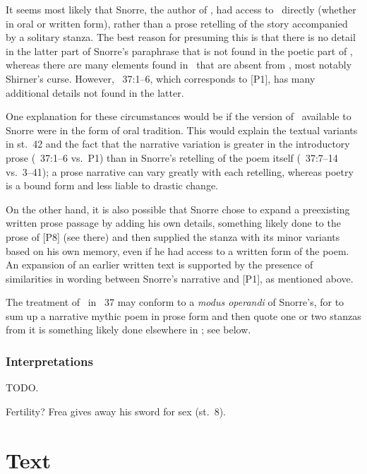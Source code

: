 It seems most likely that Snorre, the author of \Gylfaginning, had access to \Skirnismal\ directly (whether in oral or written form), rather than a prose retelling of the story accompanied by a solitary stanza.
The best reason for presuming this is that there is no detail in the latter part of Snorre’s paraphrase that is not found in the poetic part of \Skirnismal, whereas there are many elements found in \Regius\AM\ that are absent from \Gylfaginning, most notably Shirner’s curse.  However, \Gylfaginning~37:1--6, which corresponds to [P1], has many additional details not found in the latter.

One explanation for these circumstances would be if the version of \Skirnismal\ available to Snorre were in the form of oral tradition.  This would explain the textual variants in st.~42 and the fact that the narrative variation is greater in the introductory prose (\Gylfaginning~37:1--6 vs.~P1) than in Snorre’s retelling of the poem itself (\Gylfaginning~37:7--14 vs.~3--41); a prose narrative can vary greatly with each retelling, whereas poetry is a bound form and less liable to drastic change.

On the other hand, it is also possible that Snorre chose to expand a preexisting written prose passage by adding his own details, something likely done to the prose of [P8] (see there) and then supplied the stanza with its minor variants based on his own memory, even if he had access to a written form of the poem.  An expansion of an earlier written text is supported by the presence of similarities in wording between Snorre’s narrative and [P1], as mentioned above.

The treatment of \Skirnismal\ in \Gylfaginning~37 may conform to a \emph{modus operandi} of Snorre’s, for to sum up a narrative mythic poem in prose form and then quote one or two stanzas from it is something likely done elsewhere in \Gylfaginning; see  below.

\subsubsection{Interpretations}

TODO.

Fertility? Frea gives away his sword for sex (st.~8).

\newpage

\section{Text}


